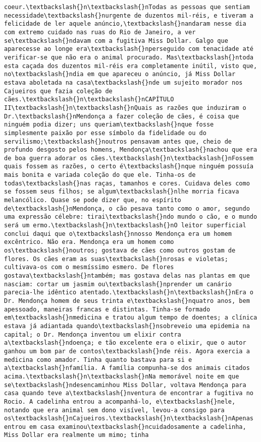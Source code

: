 \begin{Verbatim}[commandchars=\\\{\}]
coeur.\textbackslash{}n\textbackslash{}nTodas as pessoas que sentiam necessidade\textbackslash{}nurgente de duzentos mil-réis, e tiveram a felicidade de ler aquele anúncio,\textbackslash{}nandaram nesse dia com extremo cuidado nas ruas do Rio de Janeiro, a ver se\textbackslash{}ndavam com a fugitiva Miss Dollar. Galgo que aparecesse ao longe era\textbackslash{}nperseguido com tenacidade até verificar-se que não era o animal procurado. Mas\textbackslash{}ntoda esta caçada dos duzentos mil-réis era completamente inútil, visto que, no\textbackslash{}ndia em que apareceu o anúncio, já Miss Dollar estava aboletada na casa\textbackslash{}nde um sujeito morador nos Cajueiros que fazia coleção de cães.\textbackslash{}n\textbackslash{}nCAPÍTULO II\textbackslash{}n\textbackslash{}nQuais as razões que induziram o Dr.\textbackslash{}nMendonça a fazer coleção de cães, é coisa que ninguém podia dizer; uns queriam\textbackslash{}nque fosse simplesmente paixão por esse símbolo da fidelidade ou do servilismo;\textbackslash{}noutros pensavam antes que, cheio de profundo desgosto pelos homens, Mendonça\textbackslash{}nachou que era de boa guerra adorar os cães.\textbackslash{}n\textbackslash{}nFossem quais fossem as razões, o certo é\textbackslash{}nque ninguém possuía mais bonita e variada coleção do que ele. Tinha-os de todas\textbackslash{}nas raças, tamanhos e cores. Cuidava deles como se fossem seus filhos; se algum\textbackslash{}nlhe morria ficava melancólico. Quase se pode dizer que, no espírito de\textbackslash{}nMendonça, o cão pesava tanto como o amor, segundo uma expressão célebre: tirai\textbackslash{}ndo mundo o cão, e o mundo será um ermo.\textbackslash{}n\textbackslash{}nO leitor superficial conclui daqui que o\textbackslash{}nnosso Mendonça era um homem excêntrico. Não era. Mendonça era um homem como os\textbackslash{}noutros; gostava de cães como outros gostam de flores. Os cães eram as suas\textbackslash{}nrosas e violetas; cultivava-os com o mesmíssimo esmero. De flores gostava\textbackslash{}ntambém; mas gostava delas nas plantas em que nasciam: cortar um jasmim ou\textbackslash{}nprender um canário parecia-lhe idêntico atentado.\textbackslash{}n\textbackslash{}nEra o Dr. Mendonça homem de seus trinta e\textbackslash{}nquatro anos, bem apessoado, maneiras francas e distintas. Tinha-se formado em\textbackslash{}nmedicina e tratou algum tempo de doentes; a clínica estava já adiantada quando\textbackslash{}nsobreveio uma epidemia na capital; o Dr. Mendonça inventou um elixir contra a\textbackslash{}ndoença; e tão excelente era o elixir, que o autor ganhou um bom par de contos\textbackslash{}nde réis. Agora exercia a medicina como amador. Tinha quanto bastava para si e a\textbackslash{}nfamília. A família compunha-se dos animais citados acima.\textbackslash{}n\textbackslash{}nNa memorável noite em que se\textbackslash{}ndesencaminhou Miss Dollar, voltava Mendonça para casa quando teve a\textbackslash{}nventura de encontrar a fugitiva no Rocio. A cadelinha entrou a acompanhá-lo, e\textbackslash{}nele, notando que era animal sem dono visível, levou-a consigo para os\textbackslash{}nCajueiros.\textbackslash{}n\textbackslash{}nApenas entrou em casa examinou\textbackslash{}ncuidadosamente a cadelinha, Miss Dollar era realmente um mimo; tinha 
\end{Verbatim}
